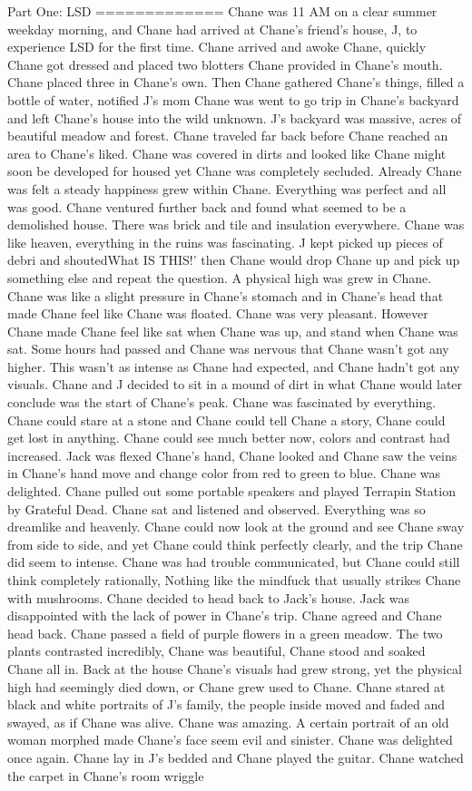 \documentclass[12pt]{book}
\begin{document}
Part One: LSD ============= Chane was 11 AM on a clear summer weekday morning, and Chane had arrived at Chane's friend's house, J, to experience LSD for the first time. Chane arrived and awoke Chane, quickly Chane got dressed and placed two blotters Chane provided in Chane's mouth. Chane placed three in Chane's own. Then Chane gathered Chane's things, filled a bottle of water, notified J's mom Chane was went to go trip in Chane's backyard and left Chane's house into the wild unknown. J's backyard was massive, acres of beautiful meadow and forest. Chane traveled far back before Chane reached an area to Chane's liked. Chane was covered in dirts and looked like Chane might soon be developed for housed yet Chane was completely secluded. Already Chane was felt a steady happiness grew within Chane. Everything was perfect and all was good. Chane ventured further back and found what seemed to be a demolished house. There was brick and tile and insulation everywhere. Chane was like heaven, everything in the ruins was fascinating. J kept picked up pieces of debri and shoutedWhat IS THIS!' then Chane would drop Chane up and pick up something else and repeat the question. A physical high was grew in Chane. Chane was like a slight pressure in Chane's stomach and in Chane's head that made Chane feel like Chane was floated. Chane was very pleasant. However Chane made Chane feel like sat when Chane was up, and stand when Chane was sat. Some hours had passed and Chane was nervous that Chane wasn't got any higher. This wasn't as intense as Chane had expected, and Chane hadn't got any visuals. Chane and J decided to sit in a mound of dirt in what Chane would later conclude was the start of Chane's peak. Chane was fascinated by everything. Chane could stare at a stone and Chane could tell Chane a story, Chane could get lost in anything. Chane could see much better now, colors and contrast had increased. Jack was flexed Chane's hand, Chane looked and Chane saw the veins in Chane's hand move and change color from red to green to blue. Chane was delighted. Chane pulled out some portable speakers and played Terrapin Station by Grateful Dead. Chane sat and listened and observed. Everything was so dreamlike and heavenly. Chane could now look at the ground and see Chane sway from side to side, and yet Chane could think perfectly clearly, and the trip Chane did seem to intense. Chane was had trouble communicated, but Chane could still think completely rationally, Nothing like the mindfuck that usually strikes Chane with mushrooms. Chane decided to head back to Jack's house. Jack was disappointed with the lack of power in Chane's trip. Chane agreed and Chane head back. Chane passed a field of purple flowers in a green meadow. The two plants contrasted incredibly, Chane was beautiful, Chane stood and soaked Chane all in. Back at the house Chane's visuals had grew strong, yet the physical high had seemingly died down, or Chane grew used to Chane. Chane stared at black and white portraits of J's family, the people inside moved and faded and swayed, as if Chane was alive. Chane was amazing. A certain portrait of an old woman morphed made Chane's face seem evil and sinister. Chane was delighted once again. Chane lay in J's bedded and Chane played the guitar. Chane watched the carpet in Chane's room wriggle 
\end{document}
